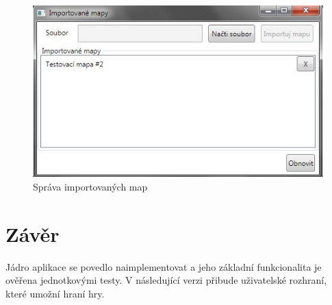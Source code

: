 \documentclass[11pt,a4paper]{scrartcl}
\begin{document}
	\begin{figure}[H]
		\centering
		\includegraphics{import-window}
		\caption{Správa importovaných map}
		\label{fig:import-window}
	\end{figure}
	 
	\section{Závěr}
	Jádro aplikace se povedlo naimplementovat a jeho základní funkcionalita je ověřena jednotkovými testy. V následující verzi přibude uživatelské rozhraní, které umožní hraní hry.
	
\end{document}
